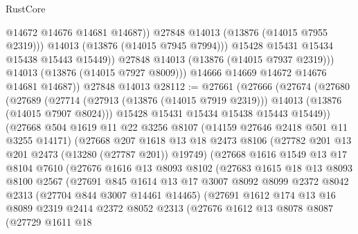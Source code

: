 \begin{lexlean}{RustCore}
\begin{coremodule}
                        @14672
                        @14676
                        @14681
                        @14687))
                    @27848
                    @14013
                    (@13876 (@14015 @7955 @2319)))
                  @14013
                  (@13876 (@14015 @7945 @7994)))
                @15428
                @15431
                @15434
                @15438
                @15443
                @15449))
            @27848
            @14013
            (@13876 (@14015 @7937 @2319)))
          @14013
          (@13876 (@14015 @7927 @8009)))
        @14666
        @14669
        @14672
        @14676
        @14681
        @14687))
    @27848
    @14013
@28112 := @27661
    (@27666
      (@27674
        (@27680
          (@27689
            (@27714 (@27913 (@13876 (@14015 @7919 @2319))) @14013 (@13876 (@14015 @7907 @8024)))
            @15428
            @15431
            @15434
            @15438
            @15443
            @15449))
        (@27668
          @504
          @1619
          @11
          @22
          @3256
          @8107
          (@14159 @27646 @2418 @501 @11 @3255 @14171)
          (@27668
            @207
            @1618
            @13
            @18
            @2473
            @8106
            (@27782 @201 @13 @201 @2473 (@13280 (@27787 @201)) @19749)
            (@27668
              @1616
              @1549
              @13
              @17
              @8104
              @7610
              (@27676
                @1616
                @13
                @8093
                @8102
                (@27683
                  @1615
                  @18
                  @13
                  @8093
                  @8100
                  @2567
                  (@27691
                    @845
                    @1614
                    @13
                    @17
                    @3007
                    @8092
                    @8099
                    @2372
                    @8042
                    @2313
                    (@27704 @844 @3007 @14461 @14465)
                    (@27691
                      @1612
                      @174
                      @13
                      @16
                      @8089
                      @2319
                      @2414
                      @2372
                      @8052
                      @2313
                      (@27676
                        @1612
                        @13
                        @8078
                        @8087
                        (@27729
                          @1611
                          @18

\end{coremodule}
\end{lexlean}

